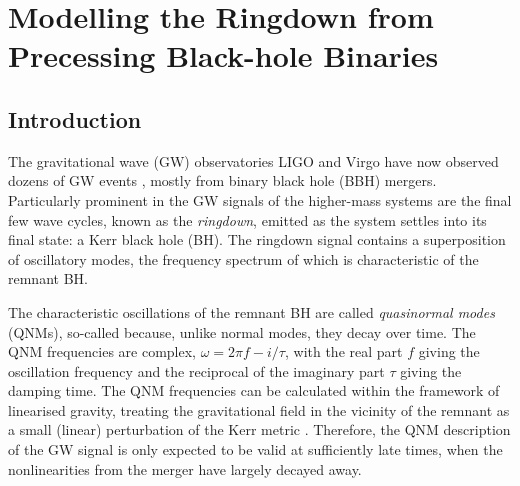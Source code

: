 
\chapter{Modelling the Ringdown from Precessing Black-hole Binaries}

\label{Chapter2}

\section{Introduction}

The gravitational wave (GW) observatories LIGO \cite{2015CQGra..32g4001L} and Virgo \cite{2015CQGra..32b4001A} have now observed dozens of GW events \cite{2019PhRvX...9c1040A, 2020arXiv201014527A}, mostly from binary black hole (BBH) mergers. 
Particularly prominent in the GW signals of the higher-mass systems are the final few wave cycles, known as the \emph{ringdown}, emitted as the system settles into its final state: a Kerr black hole (BH). 
The ringdown signal contains a superposition of oscillatory modes, the frequency spectrum of which is characteristic of the remnant BH.

The characteristic oscillations of the remnant BH are called \emph{quasinormal modes} (QNMs), so-called because, unlike normal modes, they decay over time.
The QNM frequencies are complex, $\omega = 2\pi f - {i}/\tau$, with the real part $f$ giving the oscillation frequency and the reciprocal of the imaginary part $\tau$ giving the damping time. 
The QNM frequencies can be calculated within the framework of linearised gravity, treating the gravitational field in the vicinity of the remnant as a small (linear) perturbation of the Kerr metric \cite{qnms}.
Therefore, the QNM description of the GW signal is only expected to be valid at sufficiently late times, when the nonlinearities from the merger have largely decayed away. 


